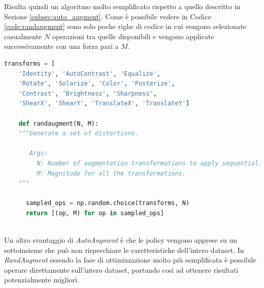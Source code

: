Risulta quindi un algoritmo molto semplificato rispetto a quello descritto in Sezione \ref{subsec:auto_augment}. Come è possibile vedere in Codice \ref{code:randaugment} sono solo poche righe di codice in cui vengono selezionate casualmente $N$ operazioni tra quelle disponibili e vengono applicate successivamente con una forza pari a $M$.
\begin{lstlisting}[caption={Algoritmo di RandAugment in Python \cite{DBLP:journals/corr/abs-1909-13719}}, language=Python, label=code:randaugment]
    transforms = [
    'Identity', 'AutoContrast', 'Equalize', 
    'Rotate', 'Solarize', 'Color', 'Posterize',
    'Contrast', 'Brightness', 'Sharpness', 
    'ShearX', 'ShearY', 'TranslateX', 'TranslateY']
    
    def randaugment(N, M): 
    """Generate a set of distortions.
    
       Args:
         N: Number of augmentation transformations to apply sequentially.
         M: Magnitude for all the transformations.
    """
    
      sampled_ops = np.random.choice(transforms, N)
      return [(op, M) for op in sampled_ops]
    
\end{lstlisting}
\label{fig:algorithm}
Un altro svantaggio di \textit{AutoAugment} è che le policy vengono apprese su un sottoinsieme che può non rispecchiare le caretteristiche dell'intero dataset. In \textit{RandAugment} essendo la fase di ottimizzazione molto più semplificata è possibile operare direttamente sull'intero dataset, portando così ad ottenere risultati potenzialmente migliori.

